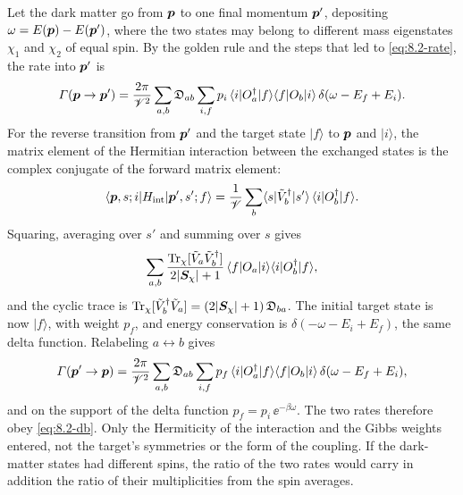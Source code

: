Let the dark matter go from $\bm{p}$ to one final momentum $\bm{p}'$, depositing $\omega = E(\bm{p}) - E(\bm{p}')$, where the two states may belong to different mass eigenstates $\chi_1$ and $\chi_2$ of equal spin. By the golden rule and the steps that led to \cref{eq:8.2-rate}, the rate into $\bm{p}'$ is
\begin{equation*}
  \varGamma(\bm{p}\to\bm{p}') = \frac{2\pi}{\mathscr{V}^2}\sum_{a,b}\mathfrak{D}_{ab}\sum_{i,f}p_i\,\langle i|O_a^\dagger|f\rangle\langle f|O_b|i\rangle\,\delta(\omega - E_f + E_i) .
\end{equation*}
For the reverse transition from $\bm{p}'$ and the target state $|f\rangle$ to $\bm{p}$ and $|i\rangle$, the matrix element of the Hermitian interaction between the exchanged states is the complex conjugate of the forward matrix element:
\begin{equation*}
  \langle\bm{p}, s; i|H_{\mathrm{int}}|\bm{p}', s'; f\rangle = \frac1{\mathscr{V}}\sum_b\langle s|\tilde V_b^\dagger|s'\rangle\,\langle i|O_b^\dagger|f\rangle .
\end{equation*}
Squaring, averaging over $s'$ and summing over $s$ gives
\begin{equation*}
  \sum_{a,b}\frac{\operatorname{Tr}_\chi[\tilde V_a\tilde V_b^\dagger]}{2|\bm{S}_\chi| + 1}\,\langle f|O_a|i\rangle\langle i|O_b^\dagger|f\rangle ,
\end{equation*}
and the cyclic trace is $\operatorname{Tr}_\chi[\tilde V_b^\dagger\tilde V_a] = (2|\bm{S}_\chi| + 1)\,\mathfrak{D}_{ba}$. The initial target state is now $|f\rangle$, with weight $p_f$, and energy conservation is $\delta(-\omega - E_i + E_f)$, the same delta function. Relabeling $a \leftrightarrow b$ gives
\begin{equation*}
  \varGamma(\bm{p}'\to\bm{p}) = \frac{2\pi}{\mathscr{V}^2}\sum_{a,b}\mathfrak{D}_{ab}\sum_{i,f}p_f\,\langle i|O_a^\dagger|f\rangle\langle f|O_b|i\rangle\,\delta(\omega - E_f + E_i) ,
\end{equation*}
and on the support of the delta function $p_f = p_i\,\ee^{-\beta\omega}$. The two rates therefore obey \cref{eq:8.2-db}. Only the Hermiticity of the interaction and the Gibbs weights entered, not the target's symmetries or the form of the coupling. If the dark-matter states had different spins, the ratio of the two rates would carry in addition the ratio of their multiplicities from the spin averages.
